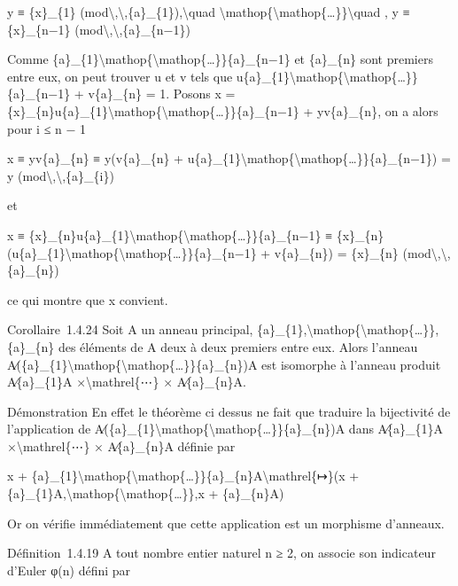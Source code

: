 \documentclass[]{article}
\begin{document}
y ≡ \{x\}\_\{1\}
(mod\textbackslash{},\textbackslash{},\{a\}\_\{1\}),\textbackslash{}quad
\textbackslash{}mathop\{\textbackslash{}mathop\{\ldots{}\}\}\textbackslash{}quad
, y ≡ \{x\}\_\{n−1\}
(mod\textbackslash{},\textbackslash{},\{a\}\_\{n−1\})

Comme
\{a\}\_\{1\}\textbackslash{}mathop\{\textbackslash{}mathop\{\ldots{}\}\}\{a\}\_\{n−1\}
et \{a\}\_\{n\} sont premiers entre eux, on peut trouver u et v tels que
u\{a\}\_\{1\}\textbackslash{}mathop\{\textbackslash{}mathop\{\ldots{}\}\}\{a\}\_\{n−1\}
+ v\{a\}\_\{n\} = 1. Posons x =
\{x\}\_\{n\}u\{a\}\_\{1\}\textbackslash{}mathop\{\textbackslash{}mathop\{\ldots{}\}\}\{a\}\_\{n−1\}
+ yv\{a\}\_\{n\}, on a alors pour i ≤ n − 1

x ≡ yv\{a\}\_\{n\} ≡ y(v\{a\}\_\{n\} +
u\{a\}\_\{1\}\textbackslash{}mathop\{\textbackslash{}mathop\{\ldots{}\}\}\{a\}\_\{n−1\})
= y (mod\textbackslash{},\textbackslash{},\{a\}\_\{i\})

et

x ≡
\{x\}\_\{n\}u\{a\}\_\{1\}\textbackslash{}mathop\{\textbackslash{}mathop\{\ldots{}\}\}\{a\}\_\{n−1\}
≡
\{x\}\_\{n\}(u\{a\}\_\{1\}\textbackslash{}mathop\{\textbackslash{}mathop\{\ldots{}\}\}\{a\}\_\{n−1\}
+ v\{a\}\_\{n\}) = \{x\}\_\{n\}
(mod\textbackslash{},\textbackslash{},\{a\}\_\{n\})

ce qui montre que x convient.

Corollaire~1.4.24 Soit A un anneau principal,
\{a\}\_\{1\},\textbackslash{}mathop\{\textbackslash{}mathop\{\ldots{}\}\},\{a\}\_\{n\}
des éléments de A deux à deux premiers entre eux. Alors l'anneau
A∕(\{a\}\_\{1\}\textbackslash{}mathop\{\textbackslash{}mathop\{\ldots{}\}\}\{a\}\_\{n\})A
est isomorphe à l'anneau produit A∕\{a\}\_\{1\}A
×\textbackslash{}mathrel\{⋯\} × A∕\{a\}\_\{n\}A.

Démonstration En effet le théorème ci dessus ne fait que traduire la
bijectivité de l'application de
A∕(\{a\}\_\{1\}\textbackslash{}mathop\{\textbackslash{}mathop\{\ldots{}\}\}\{a\}\_\{n\})A
dans A∕\{a\}\_\{1\}A ×\textbackslash{}mathrel\{⋯\} × A∕\{a\}\_\{n\}A
définie par

x +
\{a\}\_\{1\}\textbackslash{}mathop\{\textbackslash{}mathop\{\ldots{}\}\}\{a\}\_\{n\}A\textbackslash{}mathrel\{↦\}(x
+
\{a\}\_\{1\}A,\textbackslash{}mathop\{\textbackslash{}mathop\{\ldots{}\}\},x
+ \{a\}\_\{n\}A)

Or on vérifie immédiatement que cette application est un morphisme
d'anneaux.

Définition~1.4.19 A tout nombre entier naturel n ≥ 2, on associe son
indicateur d'Euler φ(n) défini par
\end{document}
